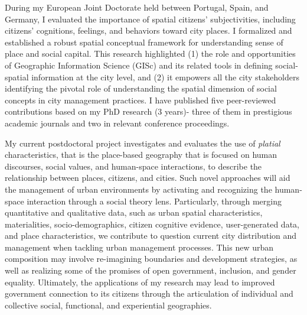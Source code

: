 
During my European Joint Doctorate held between Portugal, Spain, and Germany, I evaluated the importance of spatial citizens’ subjectivities, including citizens’ cognitions, feelings, and behaviors toward city places. I formalized and established a robust spatial conceptual framework for understanding sense of place and social capital. This research highlighted (1) the role and opportunities of Geographic Information Science (GISc) and its related tools in defining social-spatial information at the city level, and (2) it empowers all the city stakeholders identifying the pivotal role of understanding the spatial dimension of social concepts in city management practices. I have published five peer-reviewed contributions based on my PhD research (3 years)- three of them in prestigious academic journals and two in relevant conference proceedings.\par


My current postdoctoral project investigates and evaluates the use of \emph{platial} characteristics, that is the place-based geography that is focused on human discourses, social values, and human-space interactions, to describe the relationship between places, citizens, and cities. Such novel approaches will aid the management of urban environments by activating and recognizing the human-space interaction through a social theory lens. Particularly, through merging quantitative and qualitative data, such as urban spatial characteristics, materialities, socio-demographics, citizen cognitive evidence, user-generated data, and place characteristics, we contribute to question current city distribution and management when tackling urban management processes. This new urban composition may involve re-imagining boundaries and development strategies, as well as realizing some of the promises of open government, inclusion, and gender equality. Ultimately, the applications of my research may lead to improved government connection to its citizens through the articulation of individual and collective social, functional, and experiential geographies.\par



